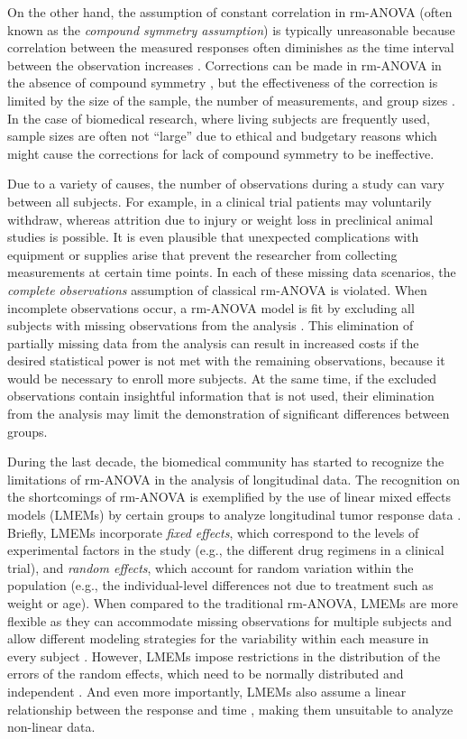 \documentclass[Royal,times,doublespace,sagev]{sagej}
\begin{document}
On the other hand, the assumption of constant correlation in rm-ANOVA (often known as the \emph{compound symmetry assumption}) is typically unreasonable because correlation between the measured responses often diminishes as the time interval between the observation increases \cite{ugrinowitsch2004}. Corrections can be made in rm-ANOVA in the absence of compound symmetry \cite{huynh1976, greenhouse1959}, but the effectiveness of the correction is limited by the size of the sample, the number of measurements\cite{haverkamp2017}, and group sizes \cite{keselman2001}. In the case of biomedical research, where living subjects are frequently used, sample sizes are often not ``large'' due to ethical and budgetary reasons \cite{charan2013} which might cause the corrections for lack of compound symmetry to be ineffective.

Due to a variety of causes, the number of observations during a study can vary between all subjects. For example, in a clinical trial patients may voluntarily withdraw, whereas attrition due to injury or weight loss in preclinical animal studies is possible. It is even plausible that unexpected complications with equipment or supplies arise that prevent the researcher from collecting measurements at certain time points. In each of these missing data scenarios, the \emph{complete observations} assumption of classical rm-ANOVA is violated. When incomplete observations occur, a rm-ANOVA model is fit by excluding all subjects with missing observations from the analysis \cite{gueorguieva2004}. This elimination of partially missing data from the analysis can result in increased costs if the desired statistical power is not met with the remaining observations, because it would be necessary to enroll more subjects. At the same time, if the excluded observations contain insightful information that is not used, their elimination from the analysis may limit the demonstration of significant differences between groups.

During the last decade, the biomedical community has started to recognize the limitations of rm-ANOVA in the analysis of longitudinal data. The recognition on the shortcomings of rm-ANOVA is exemplified by the use of linear mixed effects models (LMEMs) by certain groups to analyze longitudinal tumor response data \cite{skala2010, vishwanath2009}. Briefly, LMEMs incorporate \emph{fixed effects}, which correspond to the levels of experimental factors in the study (e.g., the different drug regimens in a clinical trial), and \emph{random effects}, which account for random variation within the population (e.g., the individual-level differences not due to treatment such as weight or age). When compared to the traditional rm-ANOVA, LMEMs are more flexible as they can accommodate missing observations for multiple subjects and allow different modeling strategies for the variability within each measure in every subject \cite{pinheiro2006}. However, LMEMs impose restrictions in the distribution of the errors of the random effects, which need to be normally distributed and independent \cite{gueorguieva2004, barr2013}. And even more importantly, LMEMs also assume a linear relationship between the response and time \cite{pinheiro2006}, making them unsuitable to analyze non-linear data.
\end{document}
